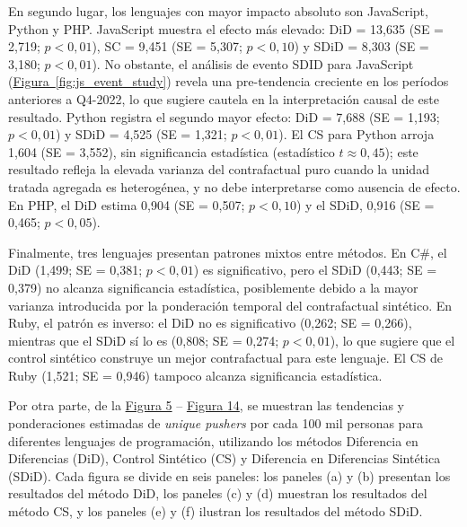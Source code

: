 \documentclass[12pt,a4paper]{article}
\begin{document}
En segundo lugar, los lenguajes con mayor impacto absoluto son JavaScript, Python y PHP. JavaScript muestra el efecto más elevado: DiD = 13,635 (SE = 2,719; $p<0{,}01$), SC = 9,451 (SE = 5,307; $p<0{,}10$) y SDiD = 8,303 (SE = 3,180; $p<0{,}01$). No obstante, el análisis de evento SDID para JavaScript (\hyperref[fig:js_event_study]{Figura~\ref*{fig:js_event_study}}) revela una pre-tendencia creciente en los períodos anteriores a Q4-2022, lo que sugiere cautela en la interpretación causal de este resultado. Python registra el segundo mayor efecto: DiD = 7,688 (SE = 1,193; $p<0{,}01$) y SDiD = 4,525 (SE = 1,321; $p<0{,}01$). El CS para Python arroja 1,604 (SE = 3,552), sin significancia estadística (estadístico $t \approx 0{,}45$); este resultado refleja la elevada varianza del contrafactual puro cuando la unidad tratada agregada es heterogénea, y no debe interpretarse como ausencia de efecto. En PHP, el DiD estima 0,904 (SE = 0,507; $p<0{,}10$) y el SDiD, 0,916 (SE = 0,465; $p<0{,}05$).

Finalmente, tres lenguajes presentan patrones mixtos entre métodos. En C\#, el DiD (1,499; SE = 0,381; $p<0{,}01$) es significativo, pero el SDiD (0,443; SE = 0,379) no alcanza significancia estadística, posiblemente debido a la mayor varianza introducida por la ponderación temporal del contrafactual sintético. En Ruby, el patrón es inverso: el DiD no es significativo (0,262; SE = 0,266), mientras que el SDiD sí lo es (0,808; SE = 0,274; $p<0{,}01$), lo que sugiere que el control sintético construye un mejor contrafactual para este lenguaje. El CS de Ruby (1,521; SE = 0,946) tampoco alcanza significancia estadística.

Por otra parte, de la \hyperref[fig:figura5]{Figura 5} -- \hyperref[fig:figura14]{Figura 14}, se muestran las tendencias y ponderaciones estimadas de \textit{unique pushers} por cada 100 mil personas para diferentes lenguajes de programación, utilizando los métodos Diferencia en Diferencias (DiD), Control Sintético (CS) y Diferencia en Diferencias Sintética (SDiD). Cada figura se divide en seis paneles: los paneles (a) y (b) presentan los resultados del método DiD, los paneles (c) y (d) muestran los resultados del método CS, y los paneles (e) y (f) ilustran los resultados del método SDiD.
\end{document}
